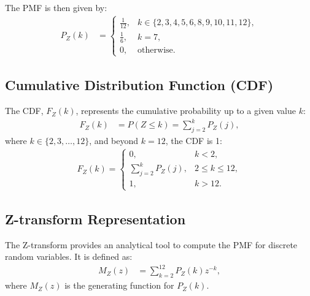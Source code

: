 \documentclass[journal]{IEEEtran}
\begin{document}
The PMF is then given by:
\begin{align}
    P_Z(k) &=
    \begin{cases}
        \frac{1}{12}, & k \in \{2, 3, 4, 5, 6, 8, 9, 10, 11, 12\}, \\
        \frac{1}{6}, & k = 7, \\
        0, & \text{otherwise}.
    \end{cases}
\end{align}

\subsection*{Cumulative Distribution Function (CDF)}
The CDF, $F_Z(k)$, represents the cumulative probability up to a given value $k$:
\begin{align}
F_Z(k) &= P(Z \leq k) = \sum_{j=2}^{k} P_Z(j),
\end{align}
where $k \in \{2, 3, \dots, 12\}$, and beyond $k = 12$, the CDF is 1:
\begin{align}
F_Z(k) =
\begin{cases} 
0, & k < 2, \\
\sum_{j=2}^{k} P_Z(j), & 2 \leq k \leq 12, \\
1, & k > 12.
\end{cases}
\end{align}

\subsection*{Z-transform Representation}
The Z-transform provides an analytical tool to compute the PMF for discrete random variables. It is defined as:
\begin{align}
M_Z(z) &= \sum_{k=2}^{12} P_Z(k) z^{-k},
\end{align}
where $M_Z(z)$ is the generating function for $P_Z(k)$.
\end{document}
